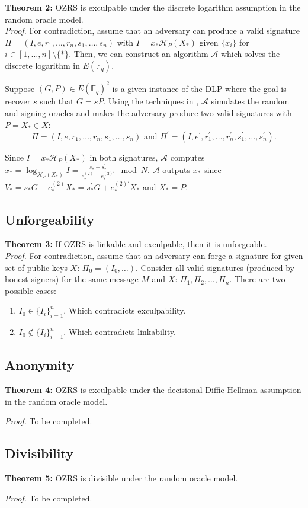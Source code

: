 \documentclass{article}
\newcommand{\sidx}{\ensuremath{*}}
\newcommand{\ix}{\ensuremath{x_i}}
\newcommand{\sx}{\ensuremath{x_\sidx}}
\newcommand{\spk}{\ensuremath{X_\sidx}}
\newcommand{\alg}{\ensuremath{\mathcal{A}}}
\newcommand{\hp}{\ensuremath{\mathcal{H}_P}}
\newcommand{\curve}{\ensuremath{E(\mathbb{F}_q)}}
\begin{document}
{\bf Theorem 2:} OZRS is exculpable under the discrete logarithm assumption in
the random oracle model. \\

{\it Proof.} For contradiction, assume that an adversary can produce a valid
signature $\Pi=(I, e, r_1, \dots, r_n, s_1, \dots, s_n)$ with $I = \sx
\hp(\spk)$ given $\{\ix\}$ for $i \in [1,\dots,n] \setminus \{*\}$.  Then, we
can construct an algorithm {\alg} which solves the discrete logarithm in
{\curve}.

Suppose $(G, P) \in \curve^2$ is a given instance of the DLP where the goal is
recover $s$ such that $G = sP$.  Using the techniques in \cite{HOLYGRAIL},
{\alg} simulates the random and signing oracles and makes the adversary produce
two valid signatures with $P = \spk \in X$: 
\[
\Pi = (I,e,r_1,\dots,r_n,s_1,\dots,s_n) 
\text{~and~} 
\Pi^\prime = (I,e^\prime,r_1^\prime,\dots,r_n^\prime,s_1^\prime,\dots,s_n^\prime).
\]

Since $I = \sx \hp(\spk)$ in both signatures, {\alg} computes $\sx =
\log_{\hp(\spk)} I = \frac{s_* - s_*^\prime}{e_*^{(2)} - e_*^{(2)\prime}} \mod
N$. {\alg} outputs $\sx$ since $V_* = s_* G + e_*^{(2)} \spk = s_*^\prime G +
e_*^{(2)\prime} \spk$ and $\spk = P$.

\subsection{Unforgeability}

{\bf Theorem 3:} If OZRS is linkable and exculpable, then it is unforgeable. \\

{\it Proof.}  For contradiction, assume that an adversary can forge a signature
for given set of public keys $X$: $\Pi_0 = (I_0,\dots)$.  Consider all valid
signatures (produced by honest signers) for the same message $M$ and $X$:
$\Pi_1, \Pi_2, \dots, \Pi_n$.  There are two possible cases:
\begin{enumerate}
  \item $I_0 \in \{I_i\}_{i=1}^n$.  Which contradicts exculpability.
  \item $I_0 \notin \{I_i\}_{i=1}^n$.  Which contradicts linkability.
\end{enumerate}

\subsection{Anonymity}

{\bf Theorem 4:} OZRS is exculpable under the decisional Diffie-Hellman
assumption in the random oracle model.

{\it Proof.} To be completed.

\subsection{Divisibility}

{\bf Theorem 5:} OZRS is divisible under the random oracle model.

{\it Proof.} To be completed.


\end{document}

